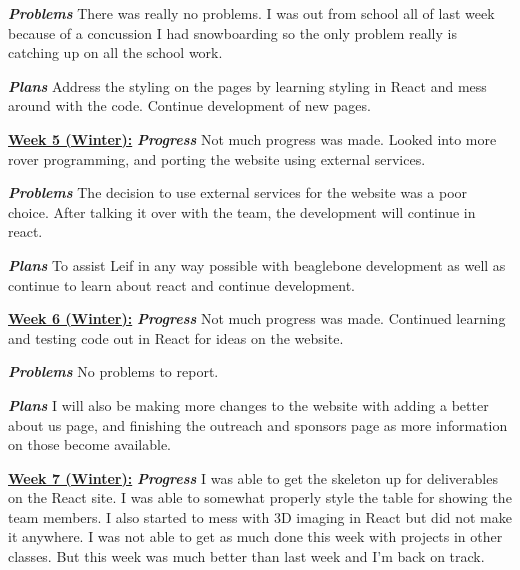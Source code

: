 \documentclass[onecolumn, draftclsnofoot, 10pt, compsoc]{IEEEtran}
\begin{document}
\textbf{\textit{{Problems}}}
\newline There was really no problems. I was out from school all of last week because of a concussion I had snowboarding so the only problem really is catching up on all the school work. \newline

\textbf{\textit{{Plans}}}
\newline Address the styling on the pages by learning styling in React and mess around with the code. Continue development of new pages. \newline 

\underline{\textbf{Week 5 (Winter):}}
\newline\textbf{\textit{{Progress}}}
\newline Not much progress was made. Looked into more rover programming, and porting the website using external services. 

\textbf{\textit{{Problems}}}
\newline The decision to use external services for the website was a poor choice. After talking it over with the team, the development will continue in react. 

\textbf{\textit{{Plans}}}
\newline  To assist Leif in any way possible with beaglebone development as well as continue to learn about react and continue development. \newline 

\underline{\textbf{Week 6 (Winter):}}
\newline\textbf{\textit{{Progress}}}
\newline Not much progress was made. Continued learning and testing code out in React for ideas on the website. 

\textbf{\textit{{Problems}}}
\newline No problems to report. 

\textbf{\textit{{Plans}}}
\newline I will also be making more changes to the website with adding a better about us page, and finishing the outreach and sponsors page as more information on those become available.  \newline 

\underline{\textbf{Week 7 (Winter):}}
\newline\textbf{\textit{{Progress}}}
\newline I was able to get the skeleton up for deliverables on the React site. I was able to somewhat properly style the table for showing the team members. I also started to mess with 3D imaging in React but did not make it anywhere. I was not able to get as much done this week with projects in other classes. But this week was much better than last week and I'm back on track. \newline 
\end{document}
